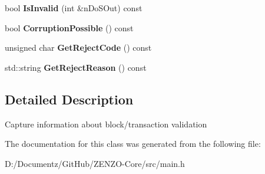 \begin{DoxyCompactItemize}
\item 
\mbox{\label{class_c_validation_state_a37ddca2d02e6cd6394e04040148edb12}} 
bool {\bfseries Is\+Invalid} (int \&n\+Do\+S\+Out) const
\item 
\mbox{\label{class_c_validation_state_add2b2dc505a8527fda32295b65bb636b}} 
bool {\bfseries Corruption\+Possible} () const
\item 
\mbox{\label{class_c_validation_state_ad90959549444c9795484785d8af97850}} 
unsigned char {\bfseries Get\+Reject\+Code} () const
\item 
\mbox{\label{class_c_validation_state_a8fa9612cb40c3c8592f7cd29b5931ccd}} 
std\+::string {\bfseries Get\+Reject\+Reason} () const
\end{DoxyCompactItemize}


\subsection{Detailed Description}
Capture information about block/transaction validation 

The documentation for this class was generated from the following file\+:\begin{DoxyCompactItemize}
\item 
D\+:/\+Documentz/\+Git\+Hub/\+Z\+E\+N\+Z\+O-\/\+Core/src/main.\+h\end{DoxyCompactItemize}
